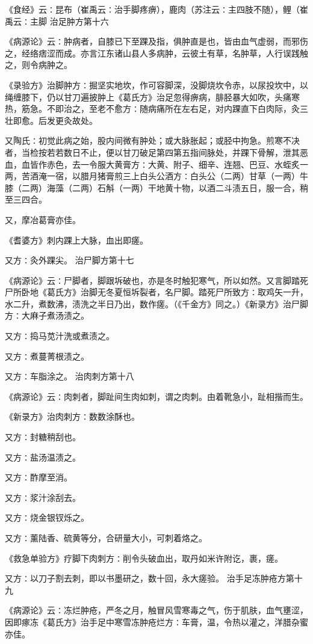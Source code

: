 \documentclass[a4paper,12pt,UTF8,twoside]{ctexbook}
\begin{document}
《食经》云∶昆布（崔禹云∶治手脚疼痹），鹿肉（苏注云∶主四肢不随），鲤（崔禹云∶主脚
治足肿方第十六

《病源论》云∶肿病者，自膝已下至踝及指，俱肿直是也，皆由血气虚弱，而邪伤之，经络痞涩而成。亦言江东诸山县人多病肿，云彼土有草，名肿草，人行误践触之，则令病肿之。

《录验方》治脚肿方∶掘坚实地坎，作可容脚深，没脚烧坎令赤，以尿投坎中，以绳缠膝下，仍以甘刀遍披肿上《葛氏方》治足忽得痹病，腓胫暴大如吹，头痛寒热，筋急。不即治之，至老不愈方∶随病痛所在左右足，对内踝直下白肉际，灸三壮即愈。后发更灸故处。

又陶氏∶初觉此病之始，股内间微有肿处；或大脉胀起；或胫中拘急。煎寒不决者，当检按若若数日不止，便以甘刀破足第四第五指间脉处，并踝下骨解，泄其恶血，血皆作赤色，去一令服大黄膏方∶大黄、附子、细辛、连翘、巴豆、水蛭炙一两，苦酒淹一宿，以腊月猪膏煎三上白头公酒方∶白头公（二两）甘草（一两）牛膝（二两）海藻（二两）石斛（一两）干地黄十物，以酒二斗渍五日，服一合，稍至三四合。

又，摩冶葛膏亦佳。

《耆婆方》刺内踝上大脉，血出即瘥。

又方∶灸外踝尖。
治尸脚方第十七

《病源论》云∶尸脚者，脚跟坼破也，亦是冬时触犯寒气，所以如然。又言脚踏死尸所卧地《葛氏方》治脚无冬夏恒坼裂者，名尸脚。踏死尸所致方∶取鸡矢一升，水二升，煮数沸，渍洗之半日乃出，数作瘥。（《千金方》同之。）《新录方》治尸脚方∶大麻子煮汤渍之。

又方∶捣马苋汁洗或煮渍之。

又方∶煮蔓菁根渍之。

又方∶车脂涂之。
治肉刺方第十八

《病源论》云∶肉刺者，脚趾间生肉如刺，谓之肉刺。由着靴急小，趾相揩而生。

《新录方》治肉刺方∶数数涂酥也。

又方∶封糖稍刮也。

又方∶盐汤温渍之。

又方∶酢摩至消。

又方∶浆汁涂刮去。

又方∶烧金银钗烁之。

又方∶薰陆香、硫黄等分，合研量大小，可刺着烙之。

《救急单验方》疗脚下肉刺方∶削令头破血出，取丹如米许附讫，裹，瘥。

又方∶以刀子割去刺，即以书墨研之，数十回，永大瘥验。
治手足冻肿疮方第十九

《病源论》云∶冻烂肿疮，严冬之月，触冒风雪寒毒之气，伤于肌肤，血气壅涩，因即瘃冻《葛氏方》治手足中寒雪冻肿疮烂方∶车膏，温，令热以灌之，洋腊杂蜜亦佳。
\end{document}
